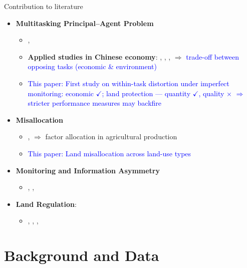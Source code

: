 \documentclass[10pt, xcolor=x11names,compress, aspectratio=169]{beamer}
\begin{document}
\begin{frame}{Contribution to literature}
\begin{itemize}
    \item \textbf{Multitasking Principal–Agent Problem}
    \begin{itemize}
        \item \cite{holmstrom1991multitask}, \cite{baker1992incentive}
        \item \textbf{Applied studies in Chinese economy}: \cite{hong2025order}, \cite{fan2023land}, \cite{chen2018career}, \cite{he2020watering} $\Rightarrow$ \textcolor{blue}{trade-off between opposing tasks (economic \& environment)}
        \item \textcolor{blue}{This paper: First study on within-task distortion under imperfect monitoring: economic $\checkmark$; land protection — quantity $\checkmark$, quality $\times$ $\Rightarrow$ stricter performance measures may backfire}
    \end{itemize} 
    \item \textbf{Misallocation}
    \begin{itemize}
        \item \cite{restuccia2017land}, \cite{adamopoulos2022misallocation} $\Rightarrow$ factor allocation in agricultural production
        \item \textcolor{blue}{This paper: Land misallocation across land-use types}
    \end{itemize}
    \item \textbf{Monitoring and Information Asymmetry}
    \begin{itemize}
        \item \cite{FismanWangYe2025_StrategicCaptureOfMonitors}, \cite{axbard2024informed}, \cite{kosack2014does}
    \end{itemize}
    \item \textbf{Land Regulation}: 
    \begin{itemize}
    \item \cite{henderson2022political}, \cite{cai2017build}, \cite{hilber2016impact}, \cite{besley2000land}
    \end{itemize}
\end{itemize} 
\end{frame}


\section*{Background and Data}
\end{document}
